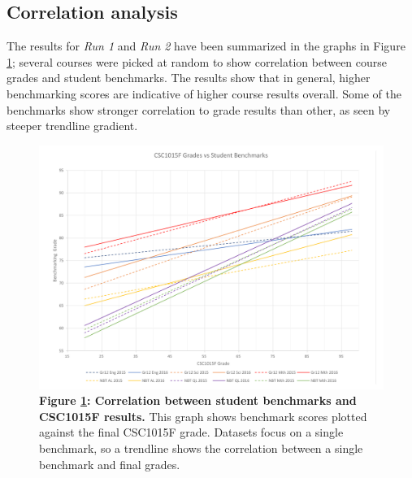 \subsection{Correlation analysis}
The results for \textit{Run 1} and \textit{Run 2} have been summarized in the graphs in Figure \ref{run1-chart1}; several courses were picked at random to show correlation between course grades and student benchmarks. The results show that in general, higher benchmarking scores are indicative of higher course results overall. Some of the benchmarks show stronger correlation to grade results than other, as seen by steeper trendline gradient.

\begin{figure}[H]
    \centering
    \begin{mdframed}
        \centering
        \includegraphics[scale=0.55]{./resources/figures/run1-chart1.png}
    \end{mdframed}
    \caption[CSC1015 grade vs benchmark correlation]{\textbf{Figure \ref{run1-chart1}: Correlation between student benchmarks and CSC1015F results.} This graph shows benchmark scores plotted against the final CSC1015F grade. Datasets focus on a single benchmark, so a trendline shows the correlation between a single benchmark and final grades.}
    \label{run1-chart1}
\end{figure}